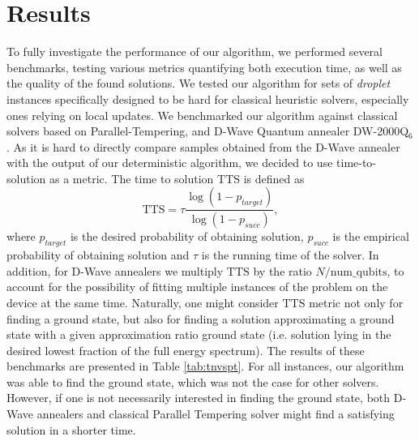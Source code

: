 \section{Results}

To fully investigate the performance of our algorithm, we performed several
benchmarks, testing various metrics quantifying both execution time, as well as
the quality of the found solutions. We tested our algorithm for sets of
\emph{droplet} instances specifically designed to be hard for classical
heuristic solvers, especially ones relying on local updates. We benchmarked our
algorithm against classical solvers based on Parallel-Tempering, and D-Wave
Quantum annealer DW-2000Q$_6$. As it is hard to directly compare samples
obtained from the D-Wave annealer with the output of our deterministic
algorithm, we decided to use time-to-solution as a metric. The time to solution
$\mbox{TTS}$ is defined as
\begin{equation}
  \label{eq:tts}
  \mbox{TTS} = \tau \frac{\log(1 - p_{target})}{\log(1 - p_{succ})},
\end{equation}
where $p_{target}$ is the desired probability of obtaining solution, $p_{succ}$
is the empirical probability of obtaining solution and $\tau$ is the running
time of the solver. In addition, for D-Wave annealers we multiply $\mbox{TTS}$
by the ratio $N/\mbox{num\_qubits}$, to account for the possibility of fitting
multiple instances of the problem on the device at the same time. Naturally,
one might consider $\mbox{TTS}$ metric not only for finding a ground state, but
also for finding a solution approximating a ground state with a given
approximation ratio ground state (i.e. solution lying in the desired lowest
fraction of the full energy spectrum). The results of these benchmarks are
presented in Table \ref{tab:tnvspt}. For all instances, our algorithm was able
to find the ground state, which was not the case for other solvers. However, if
one is not necessarily interested in finding the ground state, both D-Wave
annealers and classical Parallel Tempering solver might find a satisfying
solution in a shorter time.
